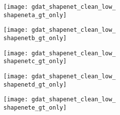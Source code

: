 \newcommand{\shapeneta}{330} %
\newcommand{\shapenetb}{66}
\newcommand{\shapenetc}{132}
\newcommand{\shapenetd}{198}
\newcommand{\shapenete}{726}

\begin{figure}
    \vspace*{-\figskipabove px}
    \centering
    
    \begin{subfigure}[t]{0.5\textwidth}
        \begin{subfigure}{0.19\textwidth}
            \centering\vspace{0px}
            \texttt{[image: gdat\_shapenet\_clean\_low\_\\shapeneta\_gt\_only]}
        \end{subfigure}
        \begin{subfigure}{0.19\textwidth}
            \centering\vspace{0px}
            \texttt{[image: gdat\_shapenet\_clean\_low\_\\shapenetb\_gt\_only]}
        \end{subfigure}
        \begin{subfigure}{0.19\textwidth}
            \centering\vspace{0px}\textbf{}
            \texttt{[image: gdat\_shapenet\_clean\_low\_\\shapenetc\_gt\_only]}
        \end{subfigure}
        \begin{subfigure}{0.19\textwidth}
            \centering\vspace{0px}
            \texttt{[image: gdat\_shapenet\_clean\_low\_\\shapenetd\_gt\_only]}
        \end{subfigure}
        \begin{subfigure}{0.19\textwidth}
            \centering\vspace{0px}
            \texttt{[image: gdat\_shapenet\_clean\_low\_\\shapenete\_gt\_only]}
        \end{subfigure}
    \end{subfigure}
    \\
    \begin{subfigure}[t]{0.29\textwidth}
        \begin{subfigure}[t]{0.49\textwidth}

\end{subfigure}
\end{subfigure}
\end{figure}

